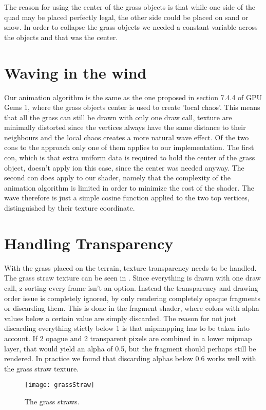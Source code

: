 The reason for using the center of the grass objects is that while one
side of the quad may be placed perfectly legal, the other side could
be placed on sand or snow. In order to collapse the grass objects we
needed a constant variable across the objects and that was the center.


\section{Waving in the wind}

Our animation algorithm is the same as the one proposed in section
7.4.4 of GPU Gems 1, where the grass objects center is used to create
'local chaos'. This means that all the grass can still be drawn with
only one draw call, texture are minimally distorted since the vertices
always have the same distance to their neighbours and the local chaos
creates a more natural wave effect. Of the two cons to the approach
only one of them applies to our implementation. The first con, which
is that extra uniform data is required to hold the center of the grass
object, doesn't apply ion this case, since the center was needed
anyway. The second con does apply to our shader, namely that the
complexity of the animation algorithm is limited in order to minimize
the cost of the shader. The wave therefore is just a simple cosine
function applied to the two top vertices, distinguished by their
texture coordinate.


\section{Handling Transparency}\label{sec:transparency}


With the grass placed on the terrain, texture transparency needs to be
handled. The grass straw texture can be seen in
. Since everything is drawn with one draw
call, z-sorting every frame isn't an option. Instead the transparency
and drawing order issue is completely ignored, by only rendering
completely opaque fragments or discarding them. This is done in the
fragment shader, where colors with alpha values below a certain value
are simply discarded. The reason for not just discarding everything
stictly below 1 is that mipmapping has to be taken into account. If 2
opague and 2 transparent pixels are combined in a lower mipmap layer,
that would yield an alpha of 0.5, but the fragment should perhaps
still be rendered. In practice we found that discarding alphas below
0.6 works well with the grass straw texture.

\begin{figure}
  \label{fig:grassStraws}
  \centering
  \texttt{[image: grassStraw]}
  \caption{The grass straws.}
\end{figure}







